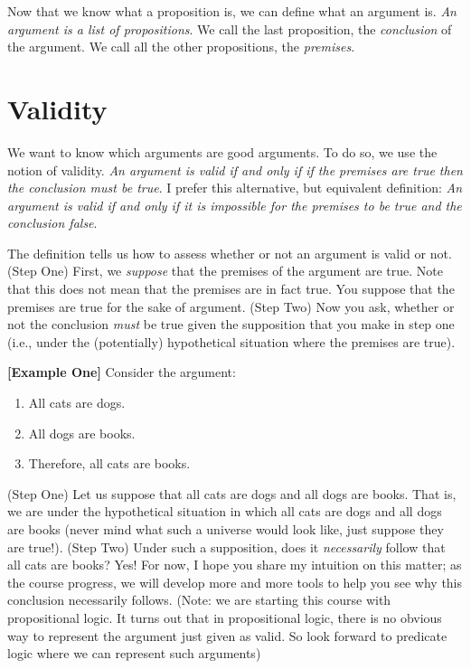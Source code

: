\documentclass[
]{book}
\providecommand{\tightlist}{%
  \setlength{\itemsep}{0pt}\setlength{\parskip}{0pt}}
\begin{document}
Now that we know what a proposition is, we can define what an argument is. \emph{An argument is a list of propositions}. We call the last proposition, the \emph{conclusion} of the argument. We call all the other propositions, the \emph{premises}.

\hypertarget{validity}{%
\section{Validity}\label{validity}}

We want to know which arguments are good arguments. To do so, we use the notion of validity. \emph{An argument is valid if and only if if the premises are true then the conclusion must be true}. I prefer this alternative, but equivalent definition: \emph{An argument is valid if and only if it is impossible for the premises to be true and the conclusion false}.

The definition tells us how to assess whether or not an argument is valid or not. (Step One) First, we \emph{suppose} that the premises of the argument are true. Note that this does not mean that the premises are in fact true. You suppose that the premises are true for the sake of argument. (Step Two) Now you ask, whether or not the conclusion \emph{must} be true given the supposition that you make in step one (i.e., under the (potentially) hypothetical situation where the premises are true).

\textbf{{[}Example One{]}} Consider the argument:

\begin{enumerate}
\def\labelenumi{\arabic{enumi}.}
\tightlist
\item
  All cats are dogs.
\item
  All dogs are books.
\item
  Therefore, all cats are books.
\end{enumerate}

(Step One) Let us suppose that all cats are dogs and all dogs are books. That is, we are under the hypothetical situation in which all cats are dogs and all dogs are books (never mind what such a universe would look like, just suppose they are true!). (Step Two) Under such a supposition, does it \emph{necessarily} follow that all cats are books? Yes! For now, I hope you share my intuition on this matter; as the course progress, we will develop more and more tools to help you see why this conclusion necessarily follows. (Note: we are starting this course with propositional logic. It turns out that in propositional logic, there is no obvious way to represent the argument just given as valid. So look forward to predicate logic where we can represent such arguments)
\end{document}
